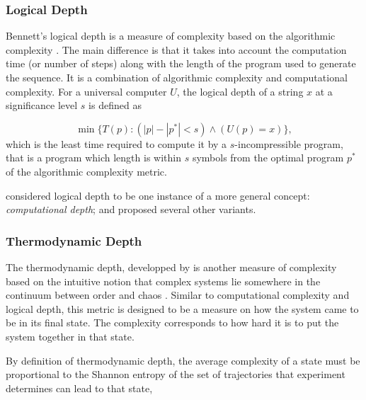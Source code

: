 \subsubsection{Logical Depth}

Bennett's logical depth is a measure of complexity based on the algorithmic
complexity \parencite{bennettDissipationInformationComputational1988,
  bennettLogicalDepthPhysical1995}. The main difference is that it takes into
account the computation time (or number of steps) along with the length of the
program used to generate the sequence. It is a combination of algorithmic
complexity and computational complexity. For a universal computer $U$, the
logical depth of a string $x$ at a significance level $s$ is defined as

\begin{equation}
  \label{eq:2}
  \min\{T(p): (|p| - |p^{*}| < s ) \wedge (U(p) = x) \},
\end{equation}
which is the least time required to compute it by a $s$-incompressible program,
that is a program which length is within $s$ symbols from the optimal program
$p^{*}$ of the algorithmic complexity metric.
\textcite{gutowitzCellularAutomataSciences1995}

\textcite{antunesComputationalDepthConcept2006} considered logical depth to be
one instance of a more general concept: \emph{computational depth}; and proposed
several other variants.

\subsubsection{Thermodynamic Depth}

The thermodynamic depth, developped by
\textcite{lloydComplexityThermodynamicDepth1988} is another measure of
complexity based on the intuitive notion that complex systems lie somewhere in
the continuum between order and chaos
\parencite{chaitinInformationRandomnessIncompleteness1990,
  ceccattoComplexityHierarchicalSystems1988, deutschQuantumTheoryChurch1985}.
Similar to computational complexity and logical depth, this metric is designed
to be a measure on how the system came to be in its final state. The complexity
corresponds to how hard it is to put the system together in that state.

By definition of thermodynamic depth, the average complexity of a state must be
proportional to the Shannon entropy
\parencite{shannonMathematicalTheoryCommunication1975} of the set of
trajectories that experiment determines can lead to that state,

